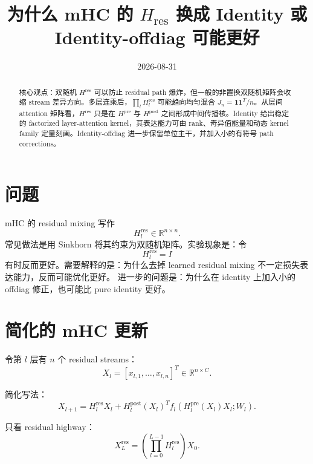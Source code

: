 \documentclass[UTF8,11pt]{ctexart}
\title{为什么 mHC 的 $H_{\mathrm{res}}$ 换成 Identity 或 Identity-offdiag 可能更好}
\author{}
\date{2026-08-31}
\newcommand{\R}{\mathbb{R}}
\newcommand{\one}{\mathbf{1}}
\newcommand{\J}{J_n}
\newcommand{\Hres}{H^{\mathrm{res}}}
\newcommand{\Hpre}{H^{\mathrm{pre}}}
\newcommand{\Hpost}{H^{\mathrm{post}}}
\begin{document}
\maketitle

\begin{abstract}
核心观点：双随机 $\Hres$ 可以防止 residual path 爆炸，但一般的非置换双随机矩阵会收缩 stream 差异方向。多层连乘后，$\prod_l \Hres_l$ 可能趋向均匀混合 $\J=\one\one^T/n$。从层间 attention 矩阵看，$\Hres$ 只是在 $H^{\mathrm{pre}}$ 与 $H^{\mathrm{post}}$ 之间形成中间传播核。Identity 给出稳定的 factorized layer-attention kernel，其表达能力可由 rank、奇异值能量和动态 kernel family 定量刻画。Identity-offdiag 进一步保留单位主干，并加入小的有符号 path corrections。
\end{abstract}

\section{问题}

mHC 的 residual mixing 写作
\begin{equation}
  \Hres_l \in \R^{n\times n}.
\end{equation}
常见做法是用 Sinkhorn 将其约束为双随机矩阵。实验现象是：令
\begin{equation}
  \Hres_l = I
\end{equation}
有时反而更好。需要解释的是：为什么去掉 learned residual mixing 不一定损失表达能力，反而可能优化更好。
进一步的问题是：为什么在 identity 上加入小的 offdiag 修正，也可能比 pure identity 更好。

\section{简化的 mHC 更新}

令第 $l$ 层有 $n$ 个 residual streams：
\begin{equation}
  X_l = [x_{l,1},\dots,x_{l,n}]^T \in \R^{n\times C}.
\end{equation}

简化写法：
\begin{equation}
  X_{l+1}
  =
  \Hres_l X_l
  +
  \Hpost_l(X_l)^T
  f_l\!\left(\Hpre_l(X_l)X_l;W_l\right).
  \label{eq:mhc-update}
\end{equation}

只看 residual highway：
\begin{equation}
  X_L^{\mathrm{res}}
  =
  \left(\prod_{l=0}^{L-1}\Hres_l\right)X_0.
  \label{eq:res-product}
\end{equation}
\end{document}
